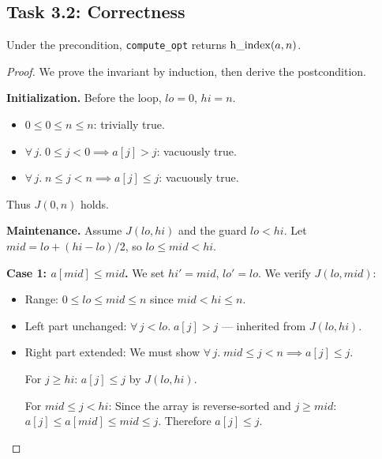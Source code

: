 \subsection{Task 3.2: Correctness}

\begin{theorem}\label{thm:opt-correct}
Under the precondition, \texttt{compute\_opt} returns $\operatorname{h\_index}(a, n)$.
\end{theorem}

\begin{proof}
We prove the invariant by induction, then derive the postcondition.

\medskip\noindent
\textbf{Initialization.}
Before the loop, $\mathit{lo} = 0$, $\mathit{hi} = n$.
\begin{itemize}
  \item $0 \leq 0 \leq n \leq n$: trivially true.
  \item $\forall\, j.\; 0 \leq j < 0 \implies a[j] > j$: vacuously true.
  \item $\forall\, j.\; n \leq j < n \implies a[j] \leq j$: vacuously true.
\end{itemize}
Thus $J(0, n)$ holds.

\medskip\noindent
\textbf{Maintenance.}
Assume $J(\mathit{lo}, \mathit{hi})$ and the guard $\mathit{lo} < \mathit{hi}$.
Let $\mathit{mid} = \mathit{lo} + (\mathit{hi} - \mathit{lo}) / 2$,
so $\mathit{lo} \leq \mathit{mid} < \mathit{hi}$.

\medskip
\textbf{Case 1: $a[\mathit{mid}] \leq \mathit{mid}$.}
We set $\mathit{hi}' = \mathit{mid}$, $\mathit{lo}' = \mathit{lo}$.
We verify $J(\mathit{lo}, \mathit{mid})$:
\begin{itemize}
  \item Range: $0 \leq \mathit{lo} \leq \mathit{mid} \leq n$ since
    $\mathit{mid} < \mathit{hi} \leq n$.
  \item Left part unchanged: $\forall\, j < \mathit{lo}.\; a[j] > j$ --- inherited from $J(\mathit{lo}, \mathit{hi})$.
  \item Right part extended: We must show
    $\forall\, j.\; \mathit{mid} \leq j < n \implies a[j] \leq j$.

    For $j \geq \mathit{hi}$: $a[j] \leq j$ by $J(\mathit{lo}, \mathit{hi})$.

    For $\mathit{mid} \leq j < \mathit{hi}$:
    Since the array is reverse-sorted and $j \geq \mathit{mid}$:
    $a[j] \leq a[\mathit{mid}] \leq \mathit{mid} \leq j$.
    Therefore $a[j] \leq j$.
\end{itemize}


\end{proof}
